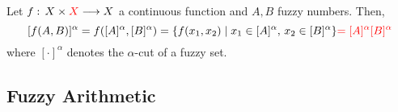 \begin{theorem}
    Let $f:\, X \times {\color{red}X}\longrightarrow X$ a continuous function and $A,B$  fuzzy numbers. Then,
    \[
    [f(A,B)]^{\alpha} = f([A]^{\alpha},[B]^{\alpha})=\{f(x_1,x_2)\mid x_1\in [A]^\alpha, \, x_2\in [B]^\alpha\}
    {\color{red}=[A]^\alpha [B]^\alpha}
    \]
    where $[\cdot]^\alpha$ denotes the $\alpha$-cut of a fuzzy set.
\end{theorem}





\subsection{Fuzzy Arithmetic}


